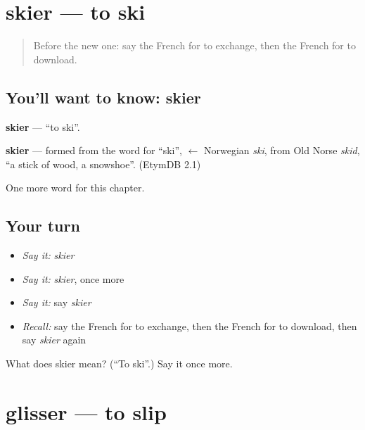 \section[skier]{skier — to ski}

\label{lesson:FR-C183-skier}



\begin{quote}
Before the new one: say the French for to exchange, then the French for to download.
\end{quote}

\subsection*{You'll want to know: skier}
\textbf{skier} — \textquotedblleft{}to ski\textquotedblright{}.

\begin{cousinweb}
\textbf{skier} — formed from the word for \textquotedblleft{}ski\textquotedblright{}, $\leftarrow$ Norwegian \emph{ski}, from Old Norse \emph{skid}, \textquotedblleft{}a stick of wood, a snowshoe\textquotedblright{}. (EtymDB 2.1)
\end{cousinweb}

\begin{grammarlens}[title={What you've built}]
One more word for this chapter.
\end{grammarlens}

\subsection*{Your turn}
\begin{itemize}
\raggedright
  \item \emph{Say it:} \emph{skier}
  \item \emph{Say it:} \emph{skier}, once more
  \item \emph{Say it:} say \emph{skier}
  \item \emph{Recall:} say the French for to exchange, then the French for to download, then say \emph{skier} again
\end{itemize}

\begin{tcolorbox}[breakable,colback=teal!4,colframe=teal!35!black,title={Before you move on}]
What does skier mean? (\textquotedblleft{}To ski\textquotedblright{}.) Say it once more.
\end{tcolorbox}
\section[glisser]{glisser — to slip}

